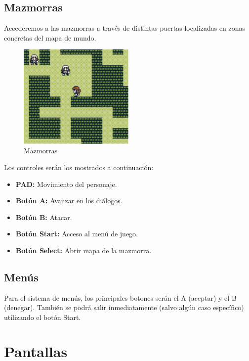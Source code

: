 \subsection{Mazmorras}

Accederemos a las mazmorras a través de distintas puertas localizadas en zonas concretas del mapa de mundo.

\begin{figure}[h]
\centering
\includegraphics[width=0.5\textwidth]{include/images/gdd/dungeon.png}
\caption{Mazmorras}
\label{figure:dungeon}
\end{figure}

Los controles serán los mostrados a continuación:

\begin{itemize}
	\item \textbf{PAD:} Movimiento del personaje.
	\item \textbf{Botón A:} Avanzar en los diálogos.
	\item \textbf{Botón B:} Atacar.
	\item \textbf{Botón Start:} Acceso al menú de juego.
	\item \textbf{Botón Select:} Abrir mapa de la mazmorra.
\end{itemize}

\subsection{Menús}

Para el sistema de menús, los principales botones serán el A (aceptar) y el B (denegar). También se podrá salir inmediatamente (salvo algún caso específico) utilizando el botón Start.

\clearpage

\section{Pantallas}

